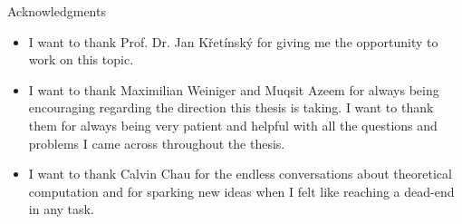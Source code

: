 \thispagestyle{empty}

\vspace*{20mm}

\begin{center}
{ Acknowledgments}
\end{center}

\vspace{10mm}

\begin{itemize}
	\item I want to thank Prof. Dr. Jan K\v{r}et\'{i}nsk\'{y} for giving me the opportunity to work on this topic.
	\item I want to thank Maximilian Weiniger and Muqsit Azeem for always being encouraging regarding the direction this thesis is taking. I want to thank them for always being very patient and helpful with all the questions and problems I came across throughout the thesis.
	\item I want to thank Calvin Chau for the endless conversations about theoretical computation and for sparking new ideas when I felt like reaching a dead-end in any task.
\end{itemize}

\cleardoublepage{}
